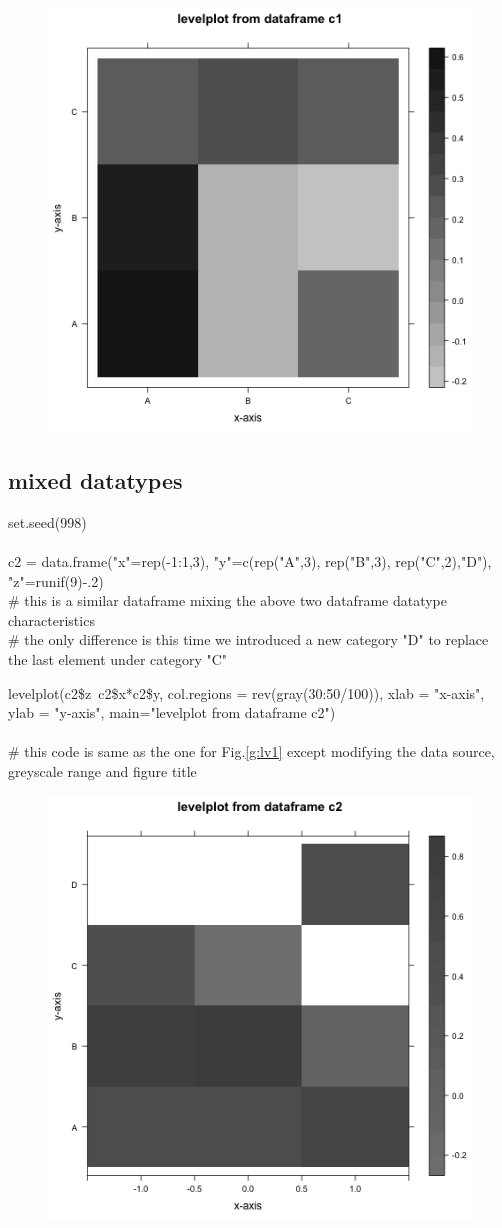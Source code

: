 \documentclass[../note.tex]{subfiles} %
\begin{document}
\begin{figure}[H]
    \centering
    \includegraphics[width=.5\linewidth]{graph/lvPlt2.png}
    \label{g:lv2}
\end{figure}

\subsection{mixed datatypes}
\begin{code}
set.seed(998)\\\\
c2 = data.frame("x"=rep(-1:1,3), "y"=c(rep("A",3), rep("B",3), rep("C",2),"D"), "z"=runif(9)-.2)\\
\# this is a similar dataframe mixing the above two dataframe datatype characteristics\\
\# the only difference is this time we introduced a new category "D" to replace the last element under category "C"
\end{code}

\begin{code}
levelplot(c2\$z~c2\$x*c2\$y, col.regions = rev(gray(30:50/100)), xlab = "x-axis", ylab = "y-axis", main="levelplot from dataframe c2")\\\\
\# this code is same as the one for Fig.\ref{g:lv1} except modifying the data source, greyscale range and figure title
\end{code}

\begin{figure}[H]
    \centering
    \includegraphics[width=.5\linewidth]{graph/lvPlt3.png}
    \label{g:lv3}
\end{figure}
\end{document}
